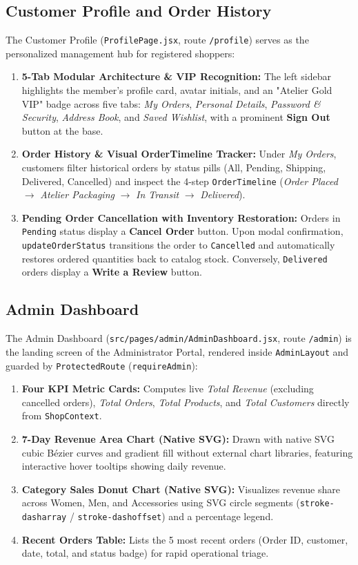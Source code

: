 \documentclass[12pt,a4paper,oneside]{report}
\begin{document}
\subsection{Customer Profile and Order History}
The Customer Profile (\texttt{ProfilePage.jsx}, route \texttt{/profile}) serves as the personalized management hub for registered shoppers:
\begin{enumerate}[leftmargin=1.2cm]
    \item \textbf{5-Tab Modular Architecture \& VIP Recognition:} The left sidebar highlights the member's profile card, avatar initials, and an "Atelier Gold VIP" badge across five tabs: \textit{My Orders}, \textit{Personal Details}, \textit{Password \& Security}, \textit{Address Book}, and \textit{Saved Wishlist}, with a prominent \textbf{Sign Out} button at the base.
    \item \textbf{Order History \& Visual OrderTimeline Tracker:} Under \textit{My Orders}, customers filter historical orders by status pills (All, Pending, Shipping, Delivered, Cancelled) and inspect the 4-step \texttt{OrderTimeline} (\textit{Order Placed} $\rightarrow$ \textit{Atelier Packaging} $\rightarrow$ \textit{In Transit} $\rightarrow$ \textit{Delivered}).
    \item \textbf{Pending Order Cancellation with Inventory Restoration:} Orders in \texttt{Pending} status display a \textbf{Cancel Order} button. Upon modal confirmation, \texttt{updateOrderStatus} transitions the order to \texttt{Cancelled} and automatically restores ordered quantities back to catalog stock. Conversely, \texttt{Delivered} orders display a \textbf{Write a Review} button.
\end{enumerate}

\subsection{Admin Dashboard}
The Admin Dashboard (\texttt{src/pages/admin/AdminDashboard.jsx}, route \texttt{/admin}) is the landing screen of the Administrator Portal, rendered inside \texttt{AdminLayout} and guarded by \texttt{ProtectedRoute} (\texttt{requireAdmin}):
\begin{enumerate}[leftmargin=1.2cm]
    \item \textbf{Four KPI Metric Cards:} Computes live \textit{Total Revenue} (excluding cancelled orders), \textit{Total Orders}, \textit{Total Products}, and \textit{Total Customers} directly from \texttt{ShopContext}.
    \item \textbf{7-Day Revenue Area Chart (Native SVG):} Drawn with native SVG cubic B\'{e}zier curves and gradient fill without external chart libraries, featuring interactive hover tooltips showing daily revenue.
    \item \textbf{Category Sales Donut Chart (Native SVG):} Visualizes revenue share across Women, Men, and Accessories using SVG circle segments (\texttt{stroke-dasharray} / \texttt{stroke-dashoffset}) and a percentage legend.
    \item \textbf{Recent Orders Table:} Lists the 5 most recent orders (Order ID, customer, date, total, and status badge) for rapid operational triage.
\end{enumerate}
\end{document}
